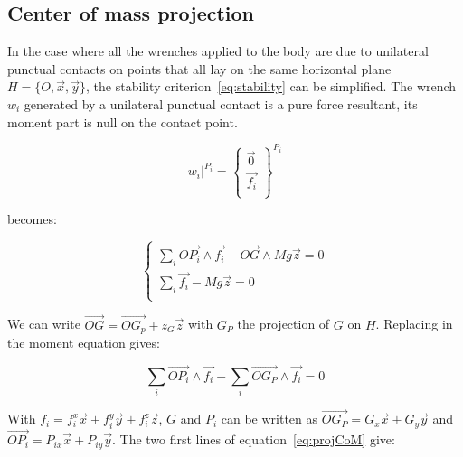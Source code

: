 \subsection{Center of mass projection}
\label{sub:center_of_mass_projection}


In the case where all the wrenches applied to the body are due to unilateral punctual contacts on points that all lay on the same horizontal plane $H = \{O, \vec{x}, \vec{y}\}$, the stability criterion~\ref{eq:stability} can be simplified.
The wrench $w_i$ generated by a unilateral punctual contact is a pure force resultant, its moment part is null on the contact point.

\begin{equation*}
    \left. w_i \right|^{P_i} =
    \left\{
      \begin{array}{r}
      \vec{0}\\
      \vec{f_i}\\
  \end{array} \right\}^{P_i}
\end{equation*}

 becomes:

\begin{equation}
\left\{
\begin{array}{r}
  \sum\limits_i \overrightarrow{OP_i}\wedge \vec{f_i} - \overrightarrow{OG} \wedge Mg\vec{z} = 0 \\
  \sum\limits_i \vec{f_i} - Mg\vec{z} = 0 \\
\end{array}
\right.
\end{equation}

We can write $\overrightarrow{OG} = \overrightarrow{OG_p} + z_G\vec{z}$ with $G_P$ the projection of $G$ on $H$. Replacing in the moment equation gives:

\begin{equation}
  \sum\limits_i \overrightarrow{OP_i}\wedge \vec{f_i} - \sum\limits_i\overrightarrow{OG_P} \wedge \vec{f_i} = 0
\label{eq:projCoM}
\end{equation}

With $f_i = f_i^x\vec{x} + f_i^y\vec{y} + f_i^z\vec{z}$, $G$ and $P_i$ can be written as $\overrightarrow{OG_P} = G_x \vec{x} + G_y\vec{y}$ and $\overrightarrow{OP_i} = P_{ix} \vec{x} + P_{iy} \vec{y}$. The two first lines of equation~\ref{eq:projCoM} give:


